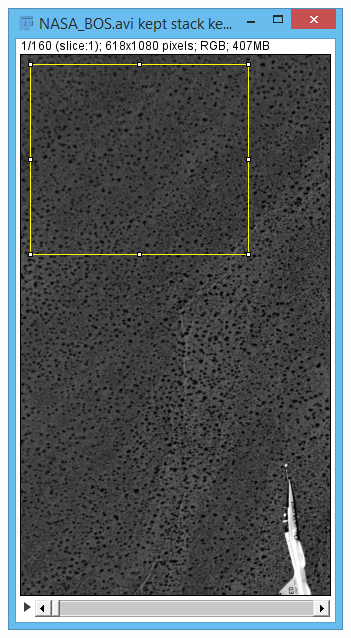 \documentclass[letterpaper,12pt]{article}
\begin{document}
\begin{figure}[h]
    \centering
    \begin{subfigure}[b]{0.25\textwidth}
        \includegraphics[width=\textwidth]{Image_Registration_ROI_Slice1.PNG}
        \caption{}
        \label{fig:Image_Registration_ROI_Slice1}
    \end{subfigure}
    \begin{subfigure}[b]{0.25\textwidth}

\end{subfigure}
\end{figure}
\end{document}
